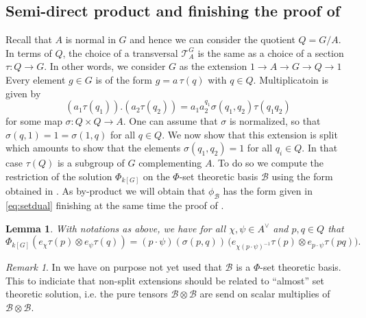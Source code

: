 \documentclass[a4paper,10pt]{amsart}
\newtheorem{lemma}{Lemma}[section]
\theoremstyle{definition}
\theoremstyle{remark}
\newtheorem*{remark*}{Remark}
\newcommand\ot{\otimes}
\newcommand\mc{\mathcal}
\begin{document}
\subsection{Semi-direct product and finishing the proof of }

Recall that $A$ is normal in $G$ and hence we can consider the quotient $Q = G/A.$ In terms of $Q$, the choice of a transversal $\mc{T}_A^G$ is the same as a choice of a section $\tau: Q \rightarrow G$. In other words, we consider $G$ as the extension
$1 \rightarrow A \rightarrow G \rightarrow Q \rightarrow 1$
Every element $g\in G$ is of the form $g= a \,\tau(q)$ with $q \in Q$. Multiplicatoin is given by 
$$(a_1 \tau(q_1)).(a_2\tau(q_2)) = a_1 a_2^{q_1} \sigma(q_1,q_2) \tau(q_1q_2) $$
for some map $\sigma : Q \times Q \rightarrow A$. One can assume that $\sigma$ is normalized, so that $\sigma(q,1) = 1 = \sigma(1,q)$ for all $q \in Q$. We now show that this extension is split which amounts to show that the elements $\sigma(q_1,q_2) =1$ for all $q_i \in Q.$ In that case $\tau(Q)$ is a subgroup of $G$ complementing $A$. To do so we compute the restriction of the solution $\Phi_{k[G]}$ on the $\Phi$-set theoretic basis $\mc{B}$ using the form obtained in . As by-product we will obtain that $\phi_{\mc{B}}$ has the form given in \eqref{eq:setdual} finishing at the same time the proof of .

\begin{lemma}\label{lem:set-theoretic-kills-cocycles}
With notations as above, we have for all $\chi,\psi\in A^\vee$ and $p,q\in Q$ that
$$
\Phi_{k[G]}(e_\chi \tau(p)\otimes e_\psi \tau(q))
=(p \cdot \psi)(\sigma(p,q))\,
\Big(e_{\chi(p\cdot\psi)^{-1}} \tau(p)\otimes e_{p\cdot\psi}\tau(pq)\Big).
$$
\end{lemma}

\begin{remark*}
    In  we have on purpose not yet used that $\mc{B}$ is a $\Phi$-set theoretic basis. This to indiciate that non-split extensions should be related to ``almost'' set theoretic solution, i.e. the pure tensors $\mc{B} \ot \mc{B}$ are send on scalar multiplies of $\mc{B} \ot \mc{B}$. 
\end{remark*}
\end{document}
